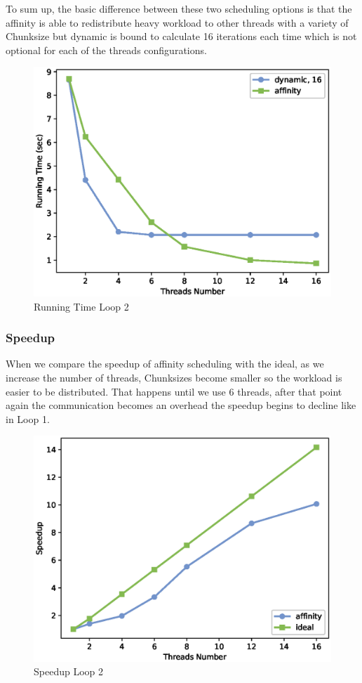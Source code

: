 \documentclass[12pt,a4paper]{article}
\begin{document}
To sum up, the basic difference between these two scheduling options is that the affinity is able to redistribute heavy workload to other threads with a variety of Chunksize but dynamic is bound to calculate 16 iterations each time which is not optional for each of the threads configurations.

\begin{figure}[ht]
    \centering
    \includegraphics[scale=0.6]{../graphs/loop2_running_time.eps}
    \caption{Running Time Loop 2}
    \label{Running Time Loop 2}
\end{figure}

\subsubsection{Speedup}

When we compare the speedup of affinity scheduling with the ideal, as we increase the number of threads, Chunksizes become smaller so the workload is easier to be distributed. That happens until we use 6 threads, after that point again the communication becomes an overhead the speedup begins to decline like in Loop 1.

\begin{figure}[ht]
    \centering
    \includegraphics[scale=0.6]{../graphs/loop2_speedup.eps}
    \caption{Speedup Loop 2}
    \label{Speedup Loop 2}
\end{figure}
\end{document}

